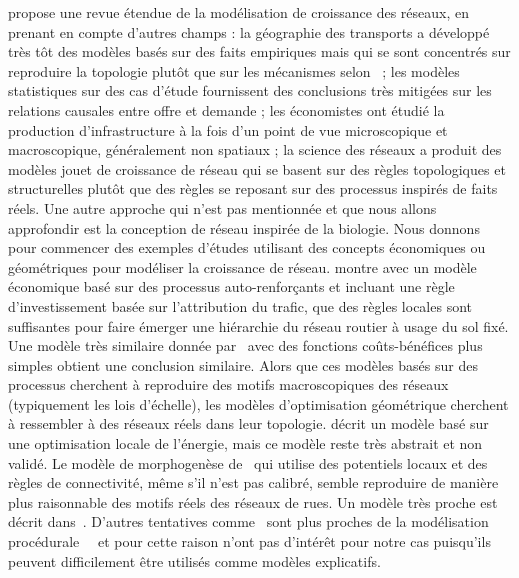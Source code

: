 {\cite{xie2009modeling} propose une revue étendue de la modélisation de croissance des réseaux, en prenant en compte d'autres champs : la géographie des transports a développé très tôt des modèles basés sur des faits empiriques mais qui se sont concentrés sur reproduire la topologie plutôt que sur les mécanismes selon~\cite{xie2009modeling} ; les modèles statistiques sur des cas d'étude fournissent des conclusions très mitigées sur les relations causales entre offre et demande ; les économistes ont étudié la production d'infrastructure à la fois d'un point de vue microscopique et macroscopique, généralement non spatiaux ; la science des réseaux a produit des modèles jouet de croissance de réseau qui se basent sur des règles topologiques et structurelles plutôt que des règles se reposant sur des processus inspirés de faits réels. Une autre approche qui n'est pas mentionnée et que nous allons approfondir est la conception de réseau inspirée de la biologie. Nous donnons pour commencer des exemples d'études utilisant des concepts économiques ou géométriques pour modéliser la croissance de réseau. \cite{yerra2005emergence} montre avec un modèle économique basé sur des processus auto-renforçants et incluant une règle d'investissement basée sur l'attribution du trafic, que des règles locales sont suffisantes pour faire émerger une hiérarchie du réseau routier à usage du sol fixé. Une modèle très similaire donnée par~\cite{louf2013emergence} avec des fonctions coûts-bénéfices plus simples obtient une conclusion similaire. Alors que ces modèles basés sur des processus cherchent à reproduire des motifs macroscopiques des réseaux (typiquement les lois d'échelle), les modèles d'optimisation géométrique cherchent à ressembler à des réseaux réels dans leur topologie. \cite{barthelemy2008modeling} décrit un modèle basé sur une optimisation locale de l'énergie, mais ce modèle reste très abstrait et non validé. Le modèle de morphogenèse de~\cite{courtat2011mathematics} qui utilise des potentiels locaux et des règles de connectivité, même s'il n'est pas calibré, semble reproduire de manière plus raisonnable des motifs réels des réseaux de rues. Un modèle très proche est décrit dans~\cite{rui2013exploring}.
D'autres tentatives comme~\cite{de2007netlogo,yamins2003growing} sont plus proches de la modélisation procédurale~~\cite{lechner2004procedural,watson2008procedural} et pour cette raison n'ont pas d'intérêt pour notre cas puisqu'ils peuvent difficilement être utilisés comme modèles explicatifs.
}





